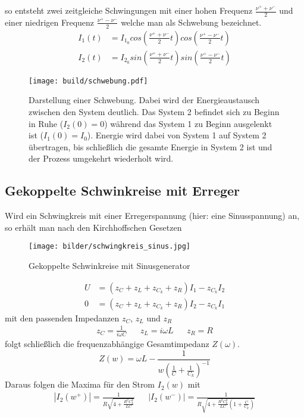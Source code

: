so entsteht zwei zeitgleiche Schwingungen mit einer hohen Frequenz $\frac{\nu^+ + \nu^-}{2}$
und einer niedrigen Frequenz $\frac{\nu^+ - \nu^-}{2}$ welche man als Schwebung bezeichnet.
\begin{align}
    I_1(t)&=I_{1_0}cos(\frac{\nu^+ + \nu^-}{2}t)cos(\frac{\nu^+ - \nu^-}{2}t)\\ 
    I_2(t)&=I_{2_0}sin(\frac{\nu^+ + \nu^-}{2}t)sin(\frac{\nu^+ - \nu^-}{2}t)
\end{align}
\begin{figure}[H]
    \centering
    \texttt{[image: build/schwebung.pdf]}
    \caption{
        Darstellung einer Schwebung. Dabei wird der Energieaustausch zwischen den System deutlich.
        Das System 2 befindet sich zu Beginn in Ruhe ($I_2(0)=0$) während das System 1 zu Beginn ausgelenkt ist
        ($I_1(0)=I_0$). Energie wird dabei von System 1 auf System 2 übertragen, bis schließlich die gesamte 
        Energie in System 2 ist und der Prozess umgekehrt wiederholt wird.
    }
\end{figure}


\subsection{Gekoppelte Schwinkreise mit Erreger}
Wird ein Schwingkreis mit einer Erregerspannung (hier: eine Sinusspannung) an,
so erhält man nach den Kirchhoffschen Gesetzen
\begin{figure}[H]
    \centering
    \texttt{[image: bilder/schwingkreis\_sinus.jpg]}
    \caption{Gekoppelte Schwinkreise mit Sinusgenerator \cite[303]{Anleitung}}
\end{figure} 
\begin{align}
    U&=(z_C+z_L+z_{C_k}+z_R)I_1-z_{C_k}I_2\\
    0&=(z_C+z_L+z_{C_k}+z_R)I_2-z_{C_k}I_1
\end{align}
mit den passenden Impedanzen $z_C$, $z_L$ und $z_R$
\begin{align*}
    z_C=\frac{1}{i\omega C}&
    &z_L=i \omega L&
    &z_R=R
\end{align*}
folgt schließlich die frequenzabhängige Gesamtimpedanz $Z(\omega)$.
\begin{equation}
    Z(w)=\omega L -\frac{1}{w(\frac{1}{C}+\frac{1}{C_k})^{-1}}
\end{equation}
Daraus folgen die Maxima für den Strom $I_2(w)$ mit
\begin{align}
    |I_2(w^+)|=\frac{1}{R\sqrt{4+\frac{R^2C_k^2}{LC}}}&&
    |I_2(w^-)|=\frac{1}{R\sqrt{4+\frac{R^2C_k^2}{LC}(1+\frac{C}{C_k})}}
\end{align}

\label{sec:theorie}